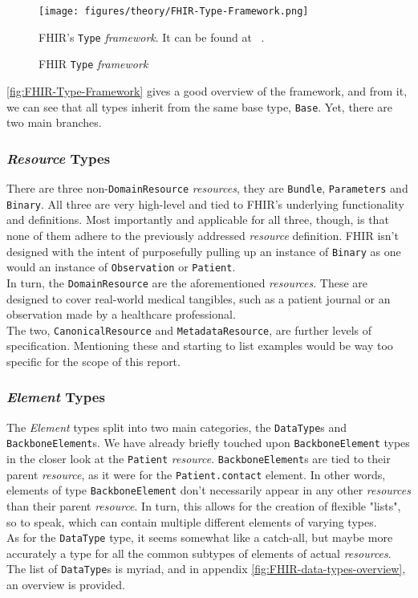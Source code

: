 \begin{figure}[H]
    \centering
    \texttt{[image: figures/theory/FHIR-Type-Framework.png]}
    \caption{FHIR \texttt{Type} \emph{framework}}
    \medskip
    \small
    \raggedright
    FHIR's \texttt{Type} \emph{framework}. It can be found at ~\cite{FHIR-type-framework}.
    \label{fig:FHIR-Type-Framework}
\end{figure}

\noindent
\autoref{fig:FHIR-Type-Framework} gives a good overview of the framework, and from it, we can see that all types inherit from the same base type, \texttt{Base}. Yet, there are two main branches.

\subsubsection*{\emph{Resource} Types}
There are three non-\texttt{DomainResource} \emph{resources}, they are \texttt{Bundle}, \texttt{Parameters} and \texttt{Binary}. All three are very high-level and tied to FHIR's underlying functionality and definitions. Most importantly and applicable for all three, though, is that none of them adhere to the previously addressed \emph{resource} definition. FHIR isn't designed with the intent of purposefully pulling up an instance of \texttt{Binary} as one would an instance of \texttt{Observation} or \texttt{Patient}.
\\
In turn, the \texttt{DomainResource} are the aforementioned \emph{resources}. These are designed to cover real-world medical tangibles, such as a patient journal or an observation made by a healthcare professional. 
\\
The two, \texttt{CanonicalResource} and \texttt{MetadataResource}, are further levels of specification. Mentioning these and starting to list examples would be way too specific for the scope of this report.

\subsubsection*{\emph{Element} Types}
The \emph{Element} types split into two main categories, the \texttt{DataType}s and \texttt{BackboneElement}s. We have already briefly touched upon \texttt{BackboneElement} types in the closer look at the \texttt{Patient} \emph{resource}. \texttt{BackboneElement}s are tied to their parent \emph{resource}, as it were for the \texttt{Patient.contact} element. In other words, elements of type \texttt{BackboneElement} don't necessarily appear in any other \emph{resources} than their parent \emph{resource}. In turn, this allows for the creation of flexible "lists", so to speak, which can contain multiple different elements of varying types.
\\
As for the \texttt{DataType} type, it seems somewhat like a catch-all, but maybe more accurately a type for all the common subtypes of elements of actual \emph{resources}. The list of \texttt{DataType}s is myriad, and in appendix \autoref{fig:FHIR-data-types-overview}, an overview is provided.
\\

